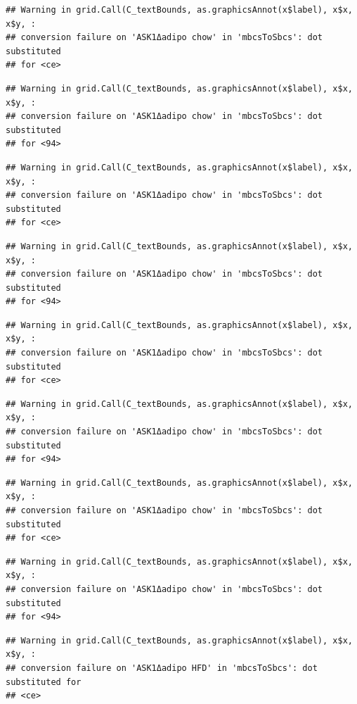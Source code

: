 \documentclass[]{book}
\begin{document}
\begin{verbatim}
## Warning in grid.Call(C_textBounds, as.graphicsAnnot(x$label), x$x, x$y, :
## conversion failure on 'ASK1Δadipo chow' in 'mbcsToSbcs': dot substituted
## for <ce>
\end{verbatim}

\begin{verbatim}
## Warning in grid.Call(C_textBounds, as.graphicsAnnot(x$label), x$x, x$y, :
## conversion failure on 'ASK1Δadipo chow' in 'mbcsToSbcs': dot substituted
## for <94>
\end{verbatim}

\begin{verbatim}
## Warning in grid.Call(C_textBounds, as.graphicsAnnot(x$label), x$x, x$y, :
## conversion failure on 'ASK1Δadipo chow' in 'mbcsToSbcs': dot substituted
## for <ce>
\end{verbatim}

\begin{verbatim}
## Warning in grid.Call(C_textBounds, as.graphicsAnnot(x$label), x$x, x$y, :
## conversion failure on 'ASK1Δadipo chow' in 'mbcsToSbcs': dot substituted
## for <94>
\end{verbatim}

\begin{verbatim}
## Warning in grid.Call(C_textBounds, as.graphicsAnnot(x$label), x$x, x$y, :
## conversion failure on 'ASK1Δadipo chow' in 'mbcsToSbcs': dot substituted
## for <ce>
\end{verbatim}

\begin{verbatim}
## Warning in grid.Call(C_textBounds, as.graphicsAnnot(x$label), x$x, x$y, :
## conversion failure on 'ASK1Δadipo chow' in 'mbcsToSbcs': dot substituted
## for <94>
\end{verbatim}

\begin{verbatim}
## Warning in grid.Call(C_textBounds, as.graphicsAnnot(x$label), x$x, x$y, :
## conversion failure on 'ASK1Δadipo chow' in 'mbcsToSbcs': dot substituted
## for <ce>
\end{verbatim}

\begin{verbatim}
## Warning in grid.Call(C_textBounds, as.graphicsAnnot(x$label), x$x, x$y, :
## conversion failure on 'ASK1Δadipo chow' in 'mbcsToSbcs': dot substituted
## for <94>
\end{verbatim}

\begin{verbatim}
## Warning in grid.Call(C_textBounds, as.graphicsAnnot(x$label), x$x, x$y, :
## conversion failure on 'ASK1Δadipo HFD' in 'mbcsToSbcs': dot substituted for
## <ce>
\end{verbatim}
\end{document}
